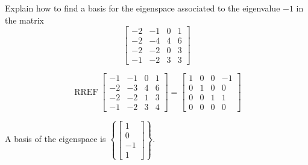
\begin{exerciseStatement}


Explain how to find a basis for the eigenspace associated to the eigenvalue \( -1 \) in the matrix \[ \left[\begin{array}{cccc}
-2 & -1 & 0 & 1 \\
-2 & -4 & 4 & 6 \\
-2 & -2 & 0 & 3 \\
-1 & -2 & 3 & 3
\end{array}\right] \]


\end{exerciseStatement}
    
\begin{exerciseAnswer} 


\[\operatorname{RREF} \left[\begin{array}{cccc}
-1 & -1 & 0 & 1 \\
-2 & -3 & 4 & 6 \\
-2 & -2 & 1 & 3 \\
-1 & -2 & 3 & 4
\end{array}\right] = \left[\begin{array}{cccc}
1 & 0 & 0 & -1 \\
0 & 1 & 0 & 0 \\
0 & 0 & 1 & 1 \\
0 & 0 & 0 & 0
\end{array}\right] \]



A basis of the eigenspace is \( \left\{ \left[\begin{array}{c}
1 \\
0 \\
-1 \\
1
\end{array}\right] \right\} \).


\end{exerciseAnswer}
    
